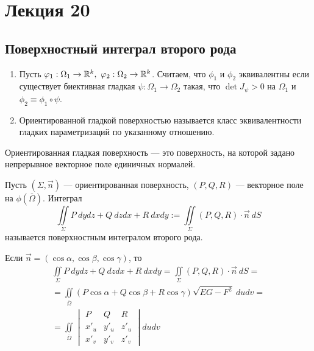 \section{Лекция 20}
\subsection{Поверхностный интеграл второго рода}
\begin{definition}\tab
    \begin{enumerate}
        \item Пусть $\phi_1: \Omega_1\to \R^k,\ \phi_2: \Omega_2\to \R^k$. Считаем, что $\phi_1$ и $\phi_2$ эквивалентны если существует биективная гладкая $\psi:\Omega_1\to \Omega_2$ такая, что $\det{J_{\psi}}> 0$ на $\Omega_1$ и $\phi_2\equiv\phi_1\circ\psi$.
        \item Ориентированной гладкой поверхностью называется класс эквивалентности гладких параметризаций по указанному отношению.
    \end{enumerate}
\end{definition}
\begin{definition}
    Ориентированная гладкая поверхность --- это поверхность, на которой задано непрерывное векторное поле единичных нормалей.
\end{definition}
\begin{definition}
    Пусть $(\Sigma, \vec{n})$ --- ориентированная поверхность, $(P,Q,R)$ --- векторное поле на $\phi(\overline{\Omega})$. Интеграл
    \[\iint\limits_{\Sigma}P\ dydz+Q\ dzdx+R\ dxdy:=\iint\limits_{\Sigma}(P,Q,R)\cdot \vec{n}\ dS\]
    называется поверхностным интегралом второго рода.
\end{definition}
\begin{comm}
    Если $\vec{n}=(\cos{\alpha},\cos{\beta},\cos{\gamma})$, то
    \begin{multline*}
        \iint\limits_{\Sigma}P\ dydz+Q\ dzdx+R\ dxdy=\iint\limits_{\Sigma}(P,Q,R)\cdot \vec{n}\ dS=\\
        =\iint\limits_{\overline{\Omega}}(P\cos{\alpha}+Q\cos{\beta}+R\cos{\gamma})\sqrt{EG-F^2}\ dudv=\\
        =\iint\limits_{\overline{\Omega}}\begin{vmatrix}
            P & Q & R\\
            x'_u & y'_u & z'_u\\
            x'_v & y'_v & z'_v
        \end{vmatrix} dudv
    \end{multline*}
\end{comm}
